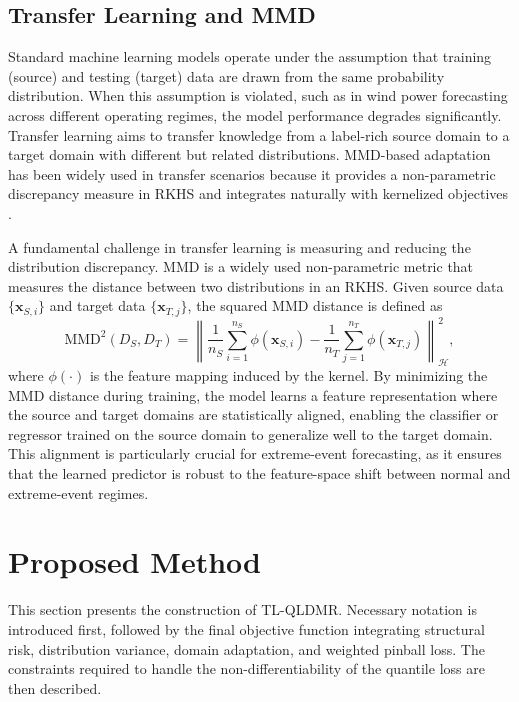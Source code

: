 \documentclass[a4paper]{cas-sc}
\begin{document}
\subsection{Transfer Learning and MMD}
Standard machine learning models operate under the assumption that training (source) and testing (target) data are drawn from the same probability distribution. When this assumption is violated, such as in wind power forecasting across different operating regimes, the model performance degrades significantly. Transfer learning aims to transfer knowledge from a label-rich source domain to a target domain with different but related distributions.
MMD-based adaptation has been widely used in transfer scenarios because it provides a non-parametric discrepancy measure in RKHS and integrates naturally with kernelized objectives \citep{TAO20123962, YAN2022107664, GUO2022118237, dp2, ss2}.

A fundamental challenge in transfer learning is measuring and reducing the distribution discrepancy. MMD is a widely used non-parametric metric that measures the distance between two distributions in an RKHS. Given source data $\{\boldsymbol{x}_{S,i}\}$ and target data $\{\boldsymbol{x}_{T,j}\}$, the squared MMD distance is defined as
\begin{equation}
\text{MMD}^2(D_S, D_T) = \left\| \frac{1}{n_S} \sum_{i=1}^{n_S} \phi(\boldsymbol{x}_{S,i}) - \frac{1}{n_T} \sum_{j=1}^{n_T} \phi(\boldsymbol{x}_{T,j}) \right\|_{\mathcal{H}}^2 ,
\end{equation}
where $\phi(\cdot)$ is the feature mapping induced by the kernel. By minimizing the MMD distance during training, the model learns a feature representation where the source and target domains are statistically aligned, enabling the classifier or regressor trained on the source domain to generalize well to the target domain. This alignment is particularly crucial for extreme-event forecasting, as it ensures that the learned predictor is robust to the feature-space shift between normal and extreme-event regimes.


\section{Proposed Method}\label{novel}
This section presents the construction of TL-QLDMR. Necessary notation is introduced first, followed by the final objective function integrating structural risk, distribution variance, domain adaptation, and weighted pinball loss. The constraints required to handle the non-differentiability of the quantile loss are then described.
\end{document}
